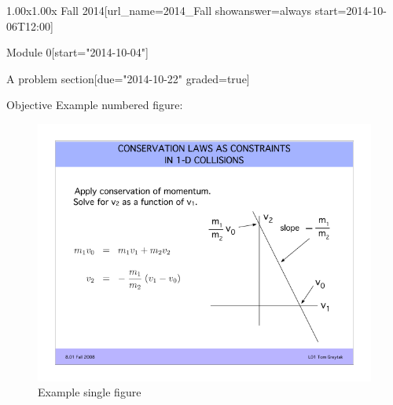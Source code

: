 \documentclass[12pt]{article}
\begin{document}
\begin{edXcourse}{1.00x}{1.00x Fall 2014}[url_name=2014_Fall showanswer=always start=2014-10-06T12:00]
\begin{edXchapter*}{Module 0}[start="2014-10-04"]
\begin{edXsequential}{A problem section}[due="2014-10-22" graded=true]
\begin{edXtext}{Objective}
Example numbered figure: %
\begin{figure}
  \begin{center}
    \includegraphics{example-image.png}
    \caption{Example single figure}

    \label{fig:single}

  \end{center}
\end{figure}


\end{edXtext}
\end{edXsequential}
\end{edXchapter*}
\end{edXcourse}
\end{document}
